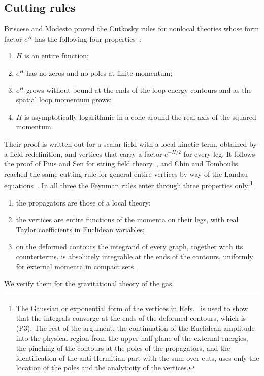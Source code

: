 \documentclass[aps,prd,10pt,twocolumn,superscriptaddress,nofootinbib,floatfix,longbibliography]{revtex4-2}
\begin{document}
\subsection{Cutting rules}
\label{sec:cutkosky}

Briscese and Modesto proved the Cutkosky rules for nonlocal theories whose form factor $e^{H}$ has the following four properties~\cite{BrisceseModesto2019}:
\begin{enumerate}[label=\textup{(U\arabic*)},leftmargin=2.4em,itemsep=0.15em]
\item $H$ is an entire function;
\item $e^{H}$ has no zeros and no poles at finite momentum;
\item $e^{H}$ grows without bound at the ends of the loop-energy contours and as the spatial loop momentum grows;
\item $H$ is asymptotically logarithmic in a cone around the real axis of the squared momentum.
\end{enumerate}
Their proof is written out for a scalar field with a local kinetic term, obtained by a field redefinition, and vertices that carry a factor $e^{-H/2}$ for every leg. It follows the proof of Pius and Sen for string field theory~\cite{PiusSen2016}, and Chin and Tomboulis reached the same cutting rule for general entire vertices by way of the Landau equations~\cite{ChinTomboulis2018}. In all three the Feynman rules enter through three properties only:\footnote{The Gaussian or exponential form of the vertices in Refs.~\cite{PiusSen2016,BrisceseModesto2019} is used to show that the integrals converge at the ends of the deformed contours, which is (P3). The rest of the argument, the continuation of the Euclidean amplitude into the physical region from the upper half plane of the external energies, the pinching of the contours at the poles of the propagators, and the identification of the anti-Hermitian part with the sum over cuts, uses only the location of the poles and the analyticity of the vertices.}
\begin{enumerate}[label=\textup{(P\arabic*)},leftmargin=2.4em,itemsep=0.15em]
\item the propagators are those of a local theory;
\item the vertices are entire functions of the momenta on their legs, with real Taylor coefficients in Euclidean variables;
\item on the deformed contours the integrand of every graph, together with its counterterms, is absolutely integrable at the ends of the contours, uniformly for external momenta in compact sets.
\end{enumerate}
We verify them for the gravitational theory of the gas.
\end{document}
